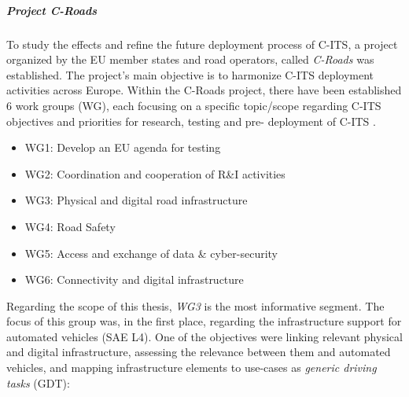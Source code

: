 \documentclass[main.tex]{subfiles}
\begin{document}

\subparagraph{Project C-Roads}\label{sec-croads}

To study the effects and refine the future deployment process of C-ITS, a project 
organized by the EU member states and road operators, called \emph{C-Roads} was established. 
The project's main objective is to harmonize C-ITS deployment activities across Europe. 
Within the C-Roads project, there have been established 6 work groups (WG), each focusing on a 
specific topic/scope regarding C-ITS objectives and priorities for research, testing and pre-
deployment of C-ITS \cite{Commision2021}. 

\begin{itemize}
    \item WG1: Develop an EU agenda for testing
    \item WG2: Coordination and cooperation of R\&I activities
    \item WG3: Physical and digital road infrastructure
    \item WG4: Road Safety
    \item WG5: Access and exchange of data \& cyber-security
    \item WG6: Connectivity and digital infrastructure
\end{itemize}

Regarding the scope of this thesis, \emph{WG3} is the most informative segment. The focus of this group 
was, in the first place, regarding the infrastructure support for automated vehicles (SAE L4). One of 
the objectives were linking relevant physical and digital infrastructure, assessing the relevance between 
them and automated vehicles, and mapping infrastructure elements to use-cases as \emph{generic driving 
tasks} (GDT):
\end{document}
